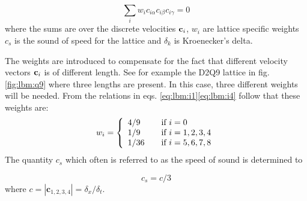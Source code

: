 \begin{equation}\label{eq:lbm:i4}
\sum_i w_ic_{i\alpha}c_{i\beta}c_{i\gamma} = 0
\end{equation}
where the sums are over the discrete velocities $\mathbf{c}_i$, $w_i$ are
lattice specific weights $c_s$ is the sound of speed for the lattice
and $\delta_k$ is Kroenecker's delta. 

The weights are introduced to compensate for the fact that different
velocity vectors $\mathbf{c}_i$ is of different length. See for example the
D2Q9 lattice in fig. \ref{fig:lbm:q9} where three lengths are
present. In this case, three different weights will be needed. From
the relations in eqs. \eqref{eq:lbm:i1}\eqref{eq:lbm:i4} follow that
these weights are: 
\begin{equation}\label{eq:lbm:weights}
w_i = 
\left\{
  \begin{array}{l l}
    4/9 & \quad \text{if $i = 0$}\\ 
    1/9 & \quad \text{if $i = 1, 2, 3, 4$}\\    
    1/36 & \quad \text{if $i = 5, 6, 7, 8$}\\
  \end{array} \right.
\end{equation}
The quantity $c_s$ which often is referred to as the speed of sound is
determined to 

\begin{equation}
c_s = c/3
\end{equation} 
where $c = |\mathbf{c}_{1,2,3,4}| = \delta_x/\delta_t$.

